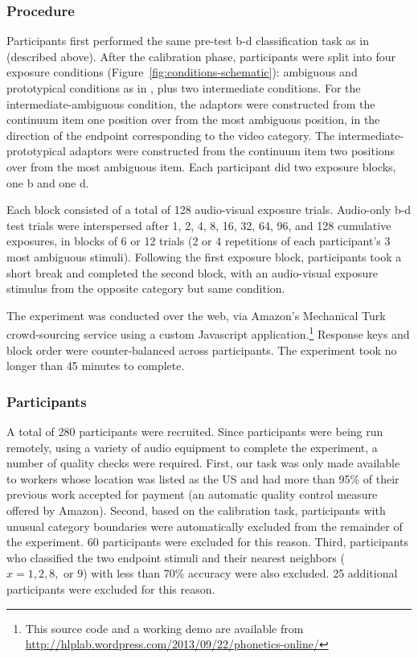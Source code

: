 \subsubsection{Procedure}
\label{sec:procedure}

Participants first performed the same pre-test \ph b-\ph d classification task as in \textcite{Vroomen2007} (described above).
After the calibration phase, participants were split into four exposure conditions (Figure~\ref{fig:conditions-schematic}): ambiguous and prototypical conditions as in \textcite{Vroomen2007}, plus two intermediate conditions. For the intermediate-ambiguous condition, the adaptors were constructed from the continuum item one position over from the most ambiguous position, in the direction of the endpoint corresponding to the video category.  The intermediate-prototypical adaptors were constructed from the continuum item two positions over from the most ambiguous item.  Each participant did two exposure blocks, one \ph b and one \ph d.

Each block consisted of a total of 128 audio-visual exposure trials.  Audio-only \ph b-\ph d test trials were interspersed after 1, 2, 4, 8, 16, 32, 64, 96, and 128 cumulative exposures, in blocks of 6 or 12 trials (2 or 4 repetitions of each participant's 3 most ambiguous stimuli).  Following the first exposure block, participants took a short break and completed the second block, with an audio-visual exposure stimulus from the opposite category but same condition.

The experiment was conducted over the web, via Amazon's Mechanical Turk crowd-sourcing service using a custom Javascript application.\footnote{This source code and a working demo are available from \url{http://hlplab.wordpress.com/2013/09/22/phonetics-online/}}  Response keys and block order were counter-balanced across participants.  The experiment took no longer than 45 minutes to complete.

\subsubsection{Participants}
\label{sec:participants}

A total of 280 participants were recruited.  Since participants were being run remotely, using a variety of audio equipment to complete the experiment, a number of quality checks were required.  First, our task was only made available to workers whose location was listed as the US and had more than 95\% of their previous work accepted for payment (an automatic quality control measure offered by Amazon).  Second, based on the calibration task, participants with unusual category boundaries \autocite[most ambiguous stimulus not one of the middle three positions 4, 5, or 6 found by][]{Vroomen2007} were automatically excluded from the remainder of the experiment.  60 participants were excluded for this reason.  Third, participants who classified the two endpoint stimuli and their nearest neighbors ($x=1,2,8,\textrm{ or } 9$) with less than 70\% accuracy were also excluded.  25 additional participants were excluded for this reason.

